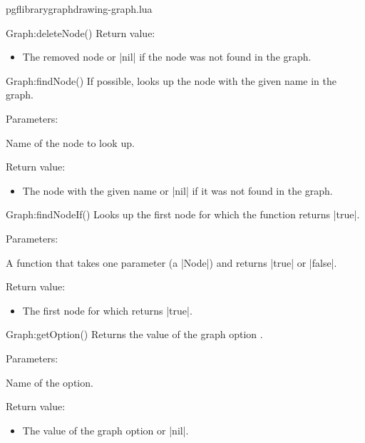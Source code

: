 \begin{filedescription}{pgflibrarygraphdrawing-graph.lua}
\begin{luacommand}{{Graph:deleteNode}()}
Return value:
\begin{itemize} \item[] The removed node or |nil| if the node was not found in the graph.  \end{itemize}


\end{luacommand}\begin{luacommand}{{Graph:findNode}()}
If possible, looks up the node with the given name in the graph. 

Parameters:
\begin{parameterdescription}
	\item[\meta{name}] Name of the node to look up. 
\end{parameterdescription}


Return value:
\begin{itemize} \item[] The node with the given name or |nil| if it was not found in the graph.  \end{itemize}


\end{luacommand}\begin{luacommand}{{Graph:findNodeIf}()}
Looks up the first node for which the function  returns |true|. 

Parameters:
\begin{parameterdescription}
	\item[\meta{test}] A function that takes one parameter (a |Node|) and returns |true| or |false|. 
\end{parameterdescription}


Return value:
\begin{itemize} \item[] The first node for which  returns |true|.  \end{itemize}


\end{luacommand}\begin{luacommand}{{Graph:getOption}()}
Returns the value of the graph option . 

Parameters:
\begin{parameterdescription}
	\item[\meta{name}] Name of the option. 
\end{parameterdescription}


Return value:
\begin{itemize} \item[] The value of the graph option  or |nil|.  \end{itemize}



\end{luacommand}
\end{filedescription}
